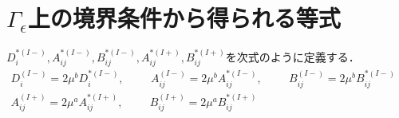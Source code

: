 \section{$\Gamma_{\epsilon}$上の境界条件から得られる等式}

$D_{i}^{*(I-)},A_{ij}^{*(I-)},B_{ij}^{*(I-)},A_{ij}^{*(I+)},B_{ij}^{*(I+)}$を次式のように定義する．
\begin{align}
	D_{i}^{(I-)}=2\mu^{b}D_{i}^{*(I-)},\hspace{1cm}A_{ij}^{(I-)}=2\mu^{b}A_{ij}^{*(I-)},\hspace{1cm}
	B_{ij}^{(I-)}=2\mu^{b}B_{ij}^{*(I-)}&
	\nonumber
	\\
	A_{ij}^{(I+)}=2\mu^{a}A_{ij}^{*(I+)},\hspace{1cm}
	B_{ij}^{(I+)}=2\mu^{a}B_{ij}^{*(I+)}&
	\label{eq:ChangeCoef}
\end{align}

